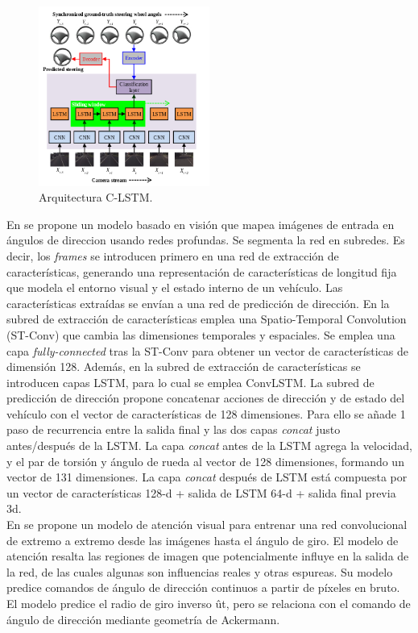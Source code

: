 \begin{figure}
\begin{center}
	\includegraphics[width=0.5\textwidth]{figures/Estado_arte/clstm.png}
   \caption{Arquitectura C-LSTM.}
	\label{fig.clstm}
\end{center}
\end{figure}

En \cite{deep-steering} se propone un modelo basado en visión que mapea imágenes de entrada en ángulos de direccion usando redes profundas. Se segmenta la red en subredes. Es decir, los \textit{frames} se introducen primero en una red de extracción de características, generando una representación de características de longitud fija que modela el entorno visual y el estado interno de un vehículo. Las características extraídas se envían a una red de predicción de dirección. En la subred de extracción de características emplea una Spatio-Temporal Convolution (ST-Conv) que cambia las dimensiones temporales y espaciales. Se emplea una capa \textit{fully-connected} tras la ST-Conv para obtener un vector de características de dimensión 128. Además, en la subred de extracción de características se introducen capas LSTM, para lo cual se emplea ConvLSTM. La subred de predicción de dirección propone concatenar acciones de dirección y de estado del vehículo con el vector de características de 128 dimensiones. Para ello se añade 1 paso de recurrencia entre la salida final y las dos capas \textit{concat} justo antes/después de la LSTM. La capa \textit{concat} antes de la LSTM agrega la velocidad, y el par de torsión y ángulo de rueda al vector de 128 dimensiones, formando un vector de 131 dimensiones. La capa \textit{concat} después de LSTM está compuesta por un vector de características 128-d + salida de LSTM 64-d + salida final previa 3d.\\

En \cite{interpretable} se propone un modelo de atención visual para entrenar una red convolucional de extremo a extremo desde las imágenes hasta el ángulo de giro. El modelo de atención resalta las regiones de imagen que potencialmente influye en la salida de la red, de las cuales algunas son influencias reales y otras espureas. Su modelo predice comandos de ángulo de dirección continuos a partir de píxeles en bruto. El modelo predice el radio de giro inverso ût, pero se relaciona con el comando de ángulo de dirección mediante geometría de Ackermann. \\

